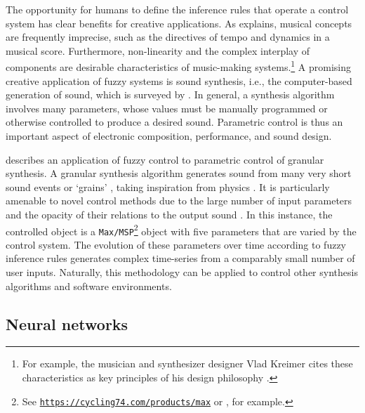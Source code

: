 The opportunity for humans to define the inference rules that operate a control system
has clear benefits for creative applications.
As \textcite[1-2]{Cadiz2020} explains, musical concepts are frequently imprecise, such
as the directives of tempo and dynamics in a musical score.
Furthermore, non-linearity and the complex interplay of components are desirable
characteristics of music-making systems.\footnote{For example, the musician and
  synthesizer designer Vlad Kreimer cites these characteristics as key principles of his
  design philosophy \parencite{mylarmelodies2023}.
}
A promising creative application of fuzzy systems is sound synthesis, i.e., the
computer-based generation of sound, which is surveyed by \textcite{dePoli1983}.
In general, a synthesis algorithm involves many parameters, whose values must be
manually programmed or otherwise controlled to produce a desired sound.
Parametric control is thus an important aspect of electronic composition, performance,
and sound design.

\textcite{Cadiz2020} describes an application of fuzzy control to
parametric control of granular synthesis.
A granular synthesis algorithm generates sound from many very short sound events or
`grains' \parencite{Roads1988}, taking inspiration from physics \parencite{Gabor1946}.
It is particularly amenable to novel control methods due to the large number of input
parameters and the opacity of their relations to the output sound
\parencite[11]{Cadiz2020}.
In this instance, the controlled object is a \texttt{Max/MSP}\footnote{See
  \href{https://cycling74.com/products/max}{\texttt{https://cycling74.com/products/max}}
  or \textcite{Manzo2011}, for example.
} object
with five parameters that are varied by the control system.
The evolution of these parameters over time according to fuzzy inference rules
generates complex time-series from a comparably small number of user inputs.
Naturally, this methodology can be applied to control other synthesis algorithms
\parencite[e.g.][]{Cadiz2018} and software environments.

\subsection{Neural networks}
\label{q1:neural-networks}

